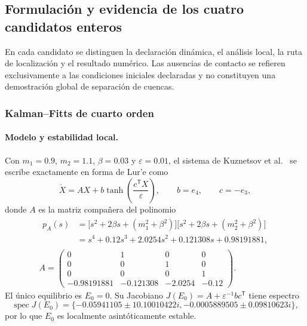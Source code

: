 \subsection{Formulación y evidencia de los cuatro candidatos enteros}

En cada candidato se distinguen la declaración dinámica, el análisis local, la
ruta de localización y el resultado numérico. Las ausencias de contacto se
refieren exclusivamente a las condiciones iniciales declaradas y no constituyen
una demostración global de separación de cuencas.

\subsubsection{Kalman--Fitts de cuarto orden}

\paragraph{Modelo y estabilidad local.}
Con \(m_1=0.9\), \(m_2=1.1\), \(\beta=0.03\) y
\(\varepsilon=0.01\), el sistema de Kuznetsov et
al.~\cite{kalman2019} se escribe exactamente en forma de Lur'e como
\begin{equation}
 \dot X=AX+b\tanh\!\left(\frac{c^{\mathsf T}X}{\varepsilon}\right),
 \qquad b=e_4,\qquad c=-e_3,
 \label{ncbench:eq:kalman-lure}
\end{equation}
donde \(A\) es la matriz compañera del polinomio
\begin{equation}
 \begin{gathered}
  \begin{aligned}
   p_A(s)&=\bigl[s^2+2\beta s+(m_1^2+\beta^2)\bigr]
            \bigl[s^2+2\beta s+(m_2^2+\beta^2)\bigr]\\
   &=s^4+0.12s^3+2.0254s^2+0.121308s+0.98191881,
  \end{aligned}\\[0.6em]
  A=\begin{pmatrix}
   0&1&0&0\\0&0&1&0\\0&0&0&1\\
   -0.98191881&-0.121308&-2.0254&-0.12
  \end{pmatrix}.
 \end{gathered}
 \label{ncbench:eq:kalman-matrix}
\end{equation}
El único equilibrio es \(E_0=0\). Su Jacobiano
\(J(E_0)=A+\varepsilon^{-1}bc^{\mathsf T}\) tiene espectro
\begin{equation}
 \operatorname{spec}J(E_0)=
 \{-0.05941105\pm10.10010422i,
   -0.0005889505\pm0.09810623i\},
 \label{ncbench:eq:kalman-spectrum}
\end{equation}
por lo que \(E_0\) es localmente asintóticamente estable.

